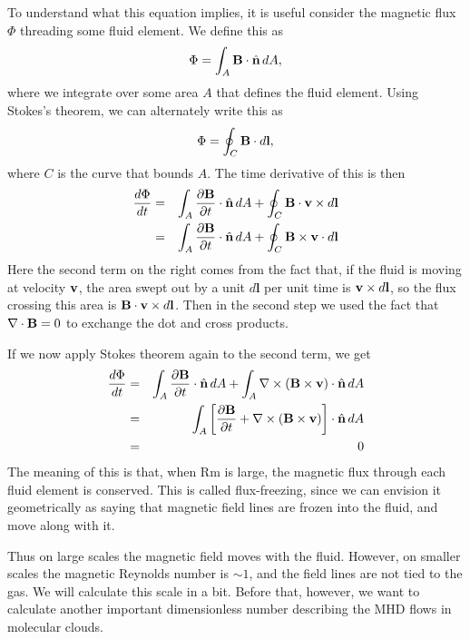 To understand what this equation implies, it is useful consider the magnetic flux $\Phi$ threading some fluid element. We define this as
\begin{equation}
\Phi = \int_A  \mathbf{B} \cdot \hat{\mathbf{n}}\, dA,
\end{equation}
where we integrate over some area $A$ that defines the fluid element. Using Stokes's theorem, we can alternately write this as
\begin{equation}
\Phi = \oint_C \mathbf{B} \cdot d\mathbf{l},
\end{equation}
where $C$ is the curve that bounds $A$. The time derivative of this is then
\begin{eqnarray}
\frac{d\Phi}{dt} & = & \int_A \frac{\partial\mathbf{B}}{\partial t}\cdot\hat{\mathbf{n}}\, dA + \oint_C \mathbf{B}\cdot \mathbf{v} \times d\mathbf{l} \\
& = & \int_A \frac{\partial\mathbf{B}}{\partial t}\cdot\hat{\mathbf{n}}\, dA + \oint_C \mathbf{B}\times \mathbf{v} \cdot d\mathbf{l}
\end{eqnarray}
Here the second term on the right comes from the fact that, if the fluid is moving at velocity $\mathbf{v}$, the area swept out by a unit $d\mathbf{l}$ per unit time is $\mathbf{v}\times d\mathbf{l}$, so the flux crossing this area is $\mathbf{B}\cdot \mathbf{v}\times d\mathbf{l}$. Then in the second step we used the fact that $\nabla\cdot \mathbf{B} = 0$ to exchange the dot and cross products.

If we now apply Stokes theorem again to the second term, we get
\begin{eqnarray}
\frac{d\Phi}{dt} 
& = & \int_A \frac{\partial\mathbf{B}}{\partial t}\cdot\hat{\mathbf{n}}\, dA + \int_A \nabla\times (\mathbf{B}\times \mathbf{v}) \cdot \hat{\mathbf{n}}\, dA \\
& = & \int_A \left[\frac{\partial\mathbf{B}}{\partial t} + \nabla\times (\mathbf{B}\times \mathbf{v})\right]\cdot\hat{\mathbf{n}}\,dA\\
& = & 0
\end{eqnarray}
The meaning of this is that, when Rm is large, the magnetic flux through each fluid element is conserved. This is called flux-freezing, since we can envision it geometrically as saying that magnetic field lines are frozen into the fluid, and move along with it.

Thus on large scales the magnetic field moves with the fluid. However, on smaller scales the magnetic Reynolds number is $\sim 1$, and the field lines are not tied to the gas. We will calculate this scale in a bit. Before that, however, we want to calculate another important dimensionless number describing the MHD flows in molecular clouds.

